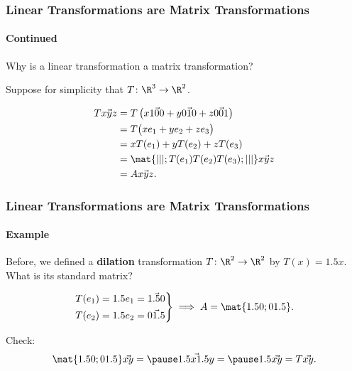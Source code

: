 \begin{frame}
\frametitle{Linear Transformations are Matrix Transformations}
\framesubtitle{Continued}

\alert{Why is a linear transformation a matrix transformation?}  

\pause\medskip
Suppose for simplicity that $T\colon\R^3\to\R^2$.
\begin{webonly}
\[\begin{split}
  T\vec{x y z} &= T\left( x\vec{1 0 0} + y\vec{0 1 0} + z\vec{0 0 1} \right) \\
  &= T\bigl( xe_1 + ye_2 + ze_3 \bigr) \\
  &= xT(e_1) + yT(e_2) + zT(e_3) \\
  &= \mat{| | |; T(e_1) T(e_2) T(e_3); | | |}\vec{x y z}\\
  &= A\vec{x y z}.
\end{split} \]
\end{webonly}

\end{frame}



\begin{frame}
\frametitle{Linear Transformations are Matrix Transformations}
\framesubtitle{Example}

Before, we defined a \textbf{dilation} transformation $T\colon\R^2\to\R^2$ by
$T(x) = 1.5x$.  What is its standard matrix?
\begin{webonly}
\[\left.\begin{aligned}
    T(e_1) &= 1.5e_1 = \vec{1.5 0} \\
    T(e_2) &= 1.5e_2 = \vec{0 1.5}
\end{aligned}\right\}
\implies A = \mat{1.5 0; 0 1.5}.\]
\end{webonly}

\pause
\alert{Check:}
\[ \mat{1.5 0; 0 1.5}\vec{x y} = \pause \vec{1.5x 1.5y}
= \pause 1.5\vec{x y} = T\vec{x y}. \]

\end{frame}



